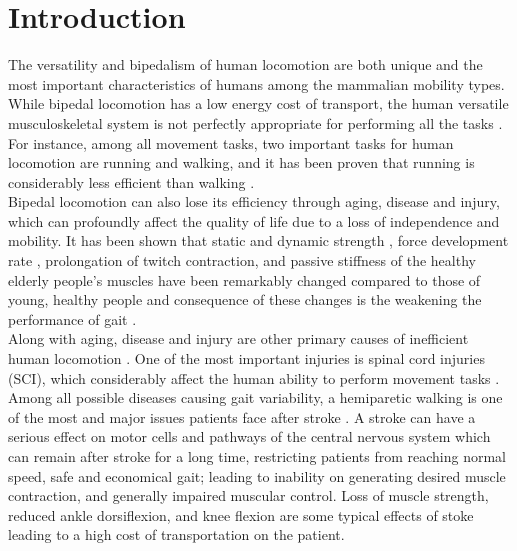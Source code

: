 \documentclass[10pt,letterpaper]{article}
\begin{document}
\section*{Introduction}
The versatility and bipedalism of human locomotion are both unique\cite{1} and the most important characteristics of humans among the mammalian mobility types. While bipedal locomotion has a low energy cost of transport\cite{1}, the human versatile musculoskeletal system is not perfectly appropriate for performing all the tasks \cite{2}. For instance, among all movement tasks, two important tasks for human locomotion are running and walking, and it has been proven that running is considerably less efficient than walking \cite{3,4}.\\
Bipedal locomotion can also lose its efficiency through aging, disease and injury, which can profoundly affect the quality of life \cite{7} due to a loss of independence and mobility. It has been shown that static and dynamic strength \cite{8,9,10}, force development rate \cite{11,12}, prolongation of twitch contraction\cite{9,13}, and passive stiffness\cite{14,15} of the healthy elderly people's muscles have been remarkably changed compared to those of young, healthy people and consequence of these changes is the weakening the performance of gait \cite{16}.\\
Along with aging, disease and injury are other primary causes of inefficient human locomotion . One of the most important injuries is spinal cord injuries (SCI), which considerably affect the human ability to perform movement tasks \cite{17}. Among all possible diseases causing gait variability, a hemiparetic walking is one of the most and major issues patients face after stroke \cite{18,19,20,21}. A stroke can have a serious effect on motor cells and pathways of the central nervous system \cite{19} which can remain after stroke for a long time, restricting patients from reaching normal speed, safe and economical gait\cite{22}; leading to inability on generating desired muscle contraction\cite{19}, and generally impaired muscular control\cite{23}. Loss of muscle strength\cite{24}, reduced ankle dorsiflexion, and knee flexion \cite{25,26} are some typical effects of stoke leading to a high cost of transportation on the patient.\\
\end{document}
